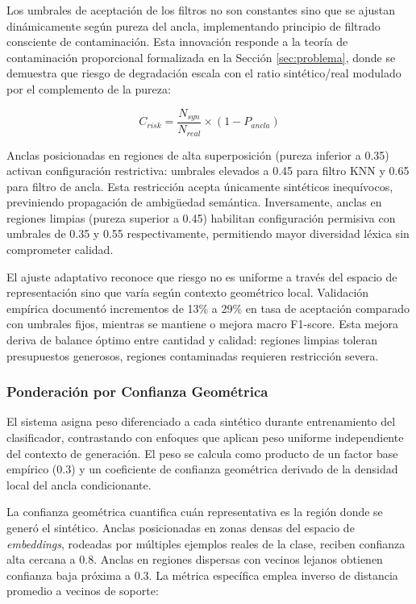 Los umbrales de aceptación de los filtros no son constantes sino que se ajustan dinámicamente según pureza del ancla, implementando principio de filtrado consciente de contaminación. Esta innovación responde a la teoría de contaminación proporcional formalizada en la Sección \ref{sec:problema}, donde se demuestra que riesgo de degradación escala con el ratio sintético/real modulado por el complemento de la pureza:

\begin{equation}
C_{risk} = \frac{N_{syn}}{N_{real}} \times (1 - P_{ancla})
\label{eq:contamination_risk_componentes}
\end{equation}

Anclas posicionadas en regiones de alta superposición (pureza inferior a 0.35) activan configuración restrictiva: umbrales elevados a 0.45 para filtro KNN y 0.65 para filtro de ancla. Esta restricción acepta únicamente sintéticos inequívocos, previniendo propagación de ambigüedad semántica. Inversamente, anclas en regiones limpias (pureza superior a 0.45) habilitan configuración permisiva con umbrales de 0.35 y 0.55 respectivamente, permitiendo mayor diversidad léxica sin comprometer calidad.

El ajuste adaptativo reconoce que riesgo no es uniforme a través del espacio de representación sino que varía según contexto geométrico local. Validación empírica documentó incrementos de 13\% a 29\% en tasa de aceptación comparado con umbrales fijos, mientras se mantiene o mejora macro F1-score. Esta mejora deriva de balance óptimo entre cantidad y calidad: regiones limpias toleran presupuestos generosos, regiones contaminadas requieren restricción severa.

\subsubsection*{Ponderación por Confianza Geométrica}

El sistema asigna peso diferenciado a cada sintético durante entrenamiento del clasificador, contrastando con enfoques que aplican peso uniforme independiente del contexto de generación. El peso se calcula como producto de un factor base empírico (0.3) y un coeficiente de confianza geométrica derivado de la densidad local del ancla condicionante.

La confianza geométrica cuantifica cuán representativa es la región donde se generó el sintético. Anclas posicionadas en zonas densas del espacio de \textit{embeddings}, rodeadas por múltiples ejemplos reales de la clase, reciben confianza alta cercana a 0.8. Anclas en regiones dispersas con vecinos lejanos obtienen confianza baja próxima a 0.3. La métrica específica emplea inverso de distancia promedio a vecinos de soporte:

